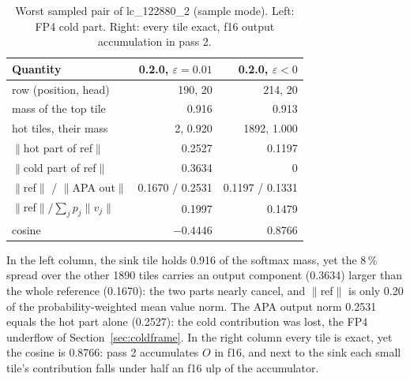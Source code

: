 \documentclass[10pt,twocolumn]{article}
\newcommand{\eps}{\varepsilon}
\begin{document}
\begin{table}[t]
\centering\small
\setlength{\tabcolsep}{3pt}
\begin{tabular}{@{}lrr@{}}
\toprule
Quantity & 0.2.0, $\eps=0.01$ & 0.2.0, $\eps<0$ \\
\midrule
row (position, head) & 190, 20 & 214, 20 \\
mass of the top tile & 0.916 & 0.913 \\
hot tiles, their mass & 2, 0.920 & 1892, 1.000 \\
$\|$hot part of ref$\|$ & 0.2527 & 0.1197 \\
$\|$cold part of ref$\|$ & 0.3634 & 0 \\
$\|$ref$\|$ / $\|$APA out$\|$ & 0.1670 / 0.2531 & 0.1197 / 0.1331 \\
$\|$ref$\| / \sum_j p_j\|v_j\|$ & 0.1997 & 0.1479 \\
cosine & $-0.4446$ & 0.8766 \\
\bottomrule
\end{tabular}
\caption{Worst sampled pair of lc\_122880\_2 (sample mode). Left: FP4 cold part. Right: every tile exact,
f16 output accumulation in pass 2.}
\label{tab:diag}
\end{table}

In the left column, the sink tile holds 0.916 of the softmax mass, yet the 8\,\% spread over the other
1890 tiles carries an output component (0.3634) larger than the whole reference (0.1670): the two parts
nearly cancel, and $\|$ref$\|$ is only 0.20 of the probability-weighted mean value norm. The APA output norm
0.2531 equals the hot part alone (0.2527): the cold contribution was lost, the FP4 underflow of
Section~\ref{sec:coldframe}. In the right column every tile is exact, yet the cosine is 0.8766: pass 2
accumulates $O$ in f16, and next to the sink each small tile's contribution falls under half an f16 ulp of
the accumulator.
\end{document}
